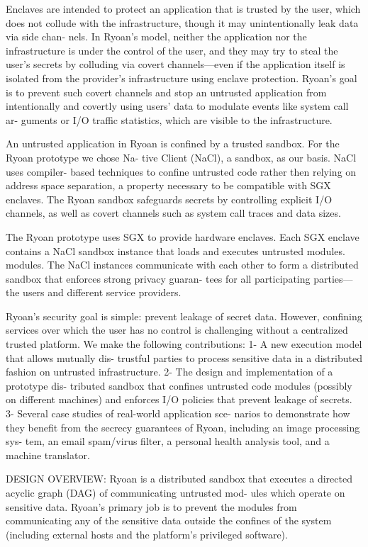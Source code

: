 \begin{itemize}
Enclaves
are intended to protect an application that is trusted by
the user, which does not collude with the infrastructure,
though it may unintentionally leak data via side chan-
nels. In Ryoan’s model, neither the application nor the
infrastructure is under the control of the user, and they
may try to steal the user’s secrets by colluding via covert
channels—even if the application itself is isolated from
the provider’s infrastructure using enclave protection.
Ryoan’s goal is to prevent such covert channels and stop
an untrusted application from intentionally and covertly
using users’ data to modulate events like system call ar-
guments or I/O traffic statistics, which are visible to the
infrastructure.

An untrusted application in Ryoan is confined by a
trusted sandbox. For the Ryoan prototype we chose Na-
tive Client (NaCl), a sandbox, as our basis. 
NaCl uses compiler-
based techniques to confine untrusted code rather then
relying on address space separation, a property necessary
to be compatible with SGX enclaves. The Ryoan sandbox
safeguards secrets by controlling explicit I/O channels,
as well as covert channels such as system call traces and
data sizes.

The Ryoan prototype uses SGX to provide hardware
enclaves. 
Each SGX enclave contains a NaCl sandbox
instance that loads and executes untrusted modules.
modules. The
NaCl instances communicate with each other to form a
distributed sandbox that enforces strong privacy guaran-
tees for all participating parties—the users and different
service providers.

Ryoan’s security goal is simple: prevent leakage of
secret data. However, confining services over which the
user has no control is challenging without a centralized
trusted platform. We make the following contributions:
1- A new execution model that allows mutually dis-
trustful parties to process sensitive data in a distributed
fashion on untrusted infrastructure.
2- The design and implementation of a prototype dis-
tributed sandbox that confines untrusted code modules
(possibly on different machines) and enforces I/O policies
that prevent leakage of secrets.
3- Several case studies of real-world application sce-
narios to demonstrate how they benefit from the secrecy
guarantees of Ryoan, including an image processing sys-
tem, an email spam/virus filter, a personal health analysis
tool, and a machine translator.

DESIGN OVERVIEW: 
Ryoan is a distributed sandbox that executes a directed
acyclic graph (DAG) of communicating untrusted mod-
ules which operate on sensitive data. Ryoan’s primary
job is to prevent the modules from communicating any
of the sensitive data outside the confines of the system
(including external hosts and the platform’s privileged
software).


\end{itemize}
